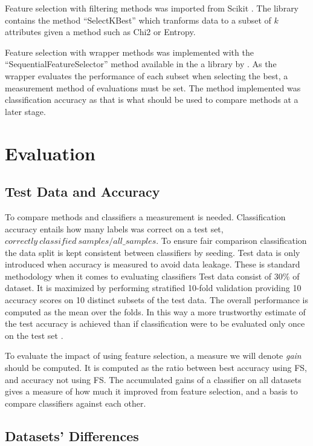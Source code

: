 Feature selection with filtering methods was imported from Scikit \parencite{scikit-learn}. The library contains the method ``SelectKBest'' which tranforms data to a subset of $k$ attributes given a method such as Chi2 or Entropy.

Feature selection with wrapper methods was implemented with the ``SequentialFeatureSelector'' method available in the a library by \textcite{mlextend}. As the wrapper evaluates the performance of each subset when selecting the best, a measurement method of evaluations must be set. The method implemented was classification accuracy as that is what should be used to compare methods at a later stage.


\section{Evaluation}
\label{Evaluation}

\subsection{Test Data and Accuracy}

To compare methods and classifiers a measurement is needed. Classification accuracy entails how many labels was correct on a test set, $correctly\:classified\:samples/all\_samples$. To ensure fair comparison classification the data split is kept consistent between classifiers by seeding. Test data is only introduced when accuracy is measured to avoid data leakage. These is standard methodology when it comes to evaluating classifiers \parencite{James:2014} Test data consist of 30\% of dataset. It is maximized by performing stratified 10-fold validation providing 10 accuracy scores on 10 distinct subsets of the test data. The overall performance is computed as the mean over the folds. In this way a more trustworthy estimate of the test accuracy is achieved than if classification were to be evaluated only once on the test set \parencite{James:2014}.

To evaluate the impact of using feature selection, a measure we will denote \textit{gain} should be computed. It is computed as the ratio between best accuracy using FS, and accuracy not using FS. The accumulated gains of a classifier on all datasets gives a measure of how much it improved from feature selection, and a basis to compare classifiers against each other.

\subsection{Datasets' Differences}

